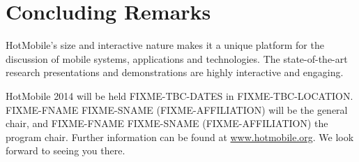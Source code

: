 \section{Concluding Remarks}
\label{sec:conclusion}
HotMobile's size and interactive nature makes it a unique platform for the
discussion of mobile systems, applications and technologies. The state-of-the-art 
research presentations and demonstrations are highly interactive and engaging.

HotMobile 2014 will be held FIXME-TBC-DATES in FIXME-TBC-LOCATION. FIXME-FNAME 
FIXME-SNAME (FIXME-AFFILIATION) will be the general chair, and FIXME-FNAME 
FIXME-SNAME (FIXME-AFFILIATION) the program chair. Further information can be 
found at \url{www.hotmobile.org}. We look forward to seeing you there.